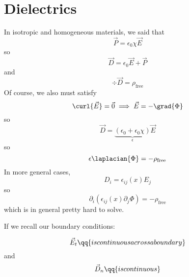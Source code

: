 \documentclass[a4paper,twoside,master.tex]{subfiles}
\begin{document}
\section{Dielectrics}
\label{sec:dielectrics}


In isotropic and homogeneous materials, we said that
\begin{equation}
    \vec{P} = \epsilon_0 \chi \vec{E}
\end{equation}
so
\begin{equation}
    \vec{D} = \epsilon_0 \vec{E} + \vec{P}
\end{equation}
and
\begin{equation}
    \div{ \vec{D}} = \rho_{\text{free}}
\end{equation}
Of course, we also must satisfy
\begin{equation}
    \curl{ \vec{E}} = \vec{0} \implies \vec{E} = - \grad{\Phi}
\end{equation}
so
\begin{equation}
    \vec{D} = \underbrace{(\epsilon_0 + \epsilon_0 \chi )}_{\epsilon} \vec{E}
\end{equation}
so
\begin{equation}
    \epsilon \laplacian{\Phi} = - \rho_{\text{free}}
\end{equation}
In more general cases,
\begin{equation}
    D_i = \epsilon_{ij} (x) E_j
\end{equation}
so
\begin{equation}
    \partial_i (\epsilon_{ij} (x) \partial_j \Phi ) = - \rho_{\text{free}}
\end{equation}
which is in general pretty hard to solve.

If we recall our boundary conditions:


\begin{equation}
    \vec{E}_{t} \qq{is continuous across a boundary}
\end{equation}
and
\begin{equation}
    \vec{D}_{n} \qq{is continuous}
\end{equation}
\end{document}
